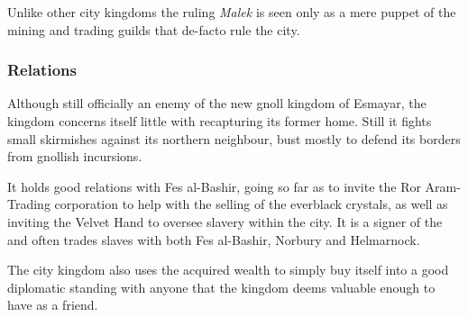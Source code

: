 Unlike other city kingdoms the ruling \emph{Malek} is seen only as a mere
puppet of the mining and trading guilds that de-facto rule the city.

\subsubsection{Relations}

Although still officially an enemy of the new gnoll kingdom of Esmayar, the
kingdom concerns itself little with recapturing its former home. Still it
fights small skirmishes against its northern neighbour, bust mostly to
defend its borders from gnollish incursions.

It holds good relations with Fes al-Bashir, going so far as to invite the Ror
Aram-Trading corporation to help with the selling of the everblack crystals,
as well as inviting the Velvet Hand to oversee slavery within the city. It is
a signer of the  and often trades slaves with both
Fes al-Bashir, Norbury and Helmarnock.

The city kingdom also uses the acquired wealth to simply buy itself into
a good diplomatic standing with anyone that the kingdom deems valuable enough
to have as a friend.
